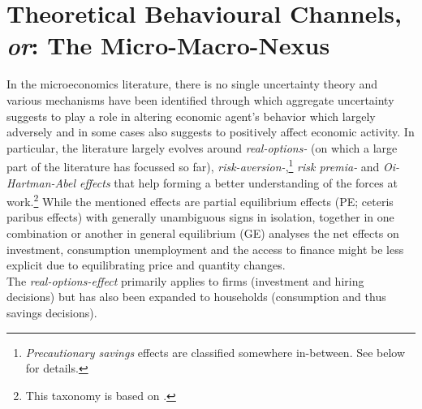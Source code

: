 \documentclass[a4paper,11pt,listof=nochaptergap,oneside,pointednumbers,bibtotoc,bigheadings,liststotoc,hidelinks]{scrbook}
\theoremstyle{mysatz}
\theoremstyle{mydefinition}
\theoremstyle{mytheorem}
\theoremstyle{mybemerkung}
\begin{document}
\section[Theoretical Behavioural Channels, \textit{or}: The Micro-Macro-Nexus]{Theoretical Behavioural Channels, \textit{or}: The Micro-Macro-Nexus}
\label{sec:studiedeffectsinrelatedliterature}

In the microeconomics literature, there is no single uncertainty theory and various mechanisms have been identified through which aggregate uncertainty suggests to play a role in altering economic agent's behavior which largely adversely and in some cases also suggests to positively affect economic activity. In particular, the literature largely evolves around \textit{real-options-} (on which a large part of the literature has focussed so far), \textit{risk-aversion-},\footnote{\textit{Precautionary savings} effects are classified somewhere in-between. See below for details.} \textit{risk premia-} and \textit{Oi-Hartman-Abel effects} that help forming a better understanding of the forces at work.\footnote{This taxonomy is based on \citet{bloom:14}.} While the mentioned effects are partial equilibrium effects (PE; ceteris paribus effects) with generally unambiguous signs in isolation, together in one combination or another in general equilibrium (GE) analyses the net effects on investment, consumption unemployment and the access to finance might be less explicit due to equilibrating price and quantity changes.\\

The \textit{real-options-effect} primarily applies to firms (investment and hiring decisions) but has also been expanded to households (consumption and thus savings decisions). 
\end{document}
